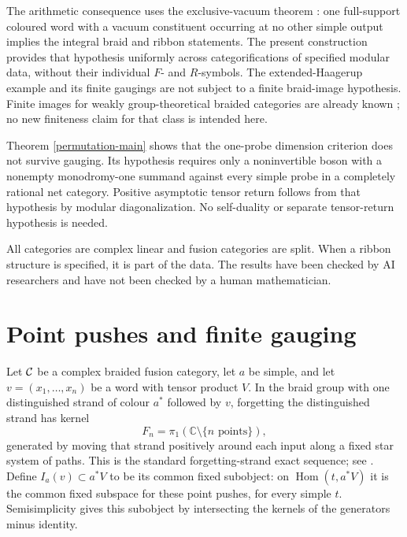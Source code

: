 \documentclass[10pt]{amsart}
\newcommand{\Hom}{\operatorname{Hom}}\newcommand{\Irr}{\operatorname{Irr}}
\begin{document}
The arithmetic consequence uses the exclusive-vacuum theorem
\cite[Theorem 17]{P56}: one full-support coloured word with a
vacuum constituent occurring at no other simple output implies
the integral braid and ribbon statements. The present construction
provides that hypothesis uniformly across categorifications of
specified modular data, without their individual $F$- and
$R$-symbols. The extended-Haagerup example and its finite
gaugings are not subject to a finite braid-image hypothesis.
Finite images for weakly group-theoretical braided categories
are already known \cite[Theorem 7.2]{GN}; no new finiteness
claim for that class is intended here.

Theorem \ref{permutation-main} shows that the one-probe
dimension criterion does not survive gauging. Its hypothesis
requires only a noninvertible boson with a nonempty monodromy-one
summand against every simple probe in a completely rational net
category. Positive asymptotic tensor return follows from that
hypothesis by modular diagonalization. No self-duality or separate
tensor-return hypothesis is needed.

All categories are complex linear and fusion categories are split.
When a ribbon structure is specified, it is part of the data.
The results have been checked by AI researchers and have not been
checked by a human mathematician.

\section{Point pushes and finite gauging}
Let $\mathcal C$ be a complex braided fusion category, let $a$ be simple,
and let $v=(x_1,\ldots,x_n)$ be a word with tensor product $V$.
In the braid group with one distinguished strand of colour $a^*$
followed by $v$, forgetting the distinguished strand has kernel
\[
             F_n=\pi_1(\mathbb C\setminus\{n\text{ points}\}),
\]
generated by moving that strand positively around each input
along a fixed star system of paths. This is the standard
forgetting-strand exact sequence; see
\cite[Theorem 1.16 and Section 1.5.2]{KT}.
Define $I_a(v)\subset a^*V$ to be its common fixed subobject:
on $\Hom(t,a^*V)$ it is the common fixed subspace for these
point pushes, for every simple $t$.
Semisimplicity gives this subobject by intersecting the kernels
of the generators minus identity.
\end{document}
